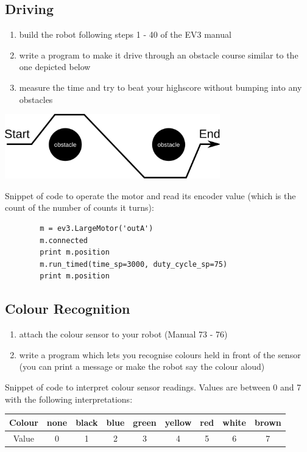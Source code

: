 \documentclass{article}
\begin{document}
  \subsection{Driving}
  \begin{enumerate}
    \item build the robot following steps 1 - 40 of the EV3 manual
    \item write a program to make it drive through an obstacle course similar 
        to the one depicted below
    \item measure the time and try to beat your highscore without bumping 
        into any obstacles
  \end{enumerate}

    \begin{center}
        \includegraphics[width=0.7\textwidth]{obstacle_course}
    \end{center}

    Snippet of code to operate the motor and read its encoder value
    (which is the count of the number of counts it turns): \\
    \begin{verbatim}
        m = ev3.LargeMotor('outA')
        m.connected
        print m.position
        m.run_timed(time_sp=3000, duty_cycle_sp=75)
        print m.position
    \end{verbatim}

  \subsection{Colour Recognition}
  \begin{enumerate}
      \item attach the colour sensor to your robot (Manual 73 - 76) 
    \item write a program which lets you recognise colours held in front of the sensor (you
        can print a message or make the robot say the colour aloud)
  \end{enumerate}

  Snippet of code to interpret colour sensor readings. Values are between
  0 and 7 with the following interpretations:
  \begin{table}[h]
      \centering
      \begin{tabular}{ c | c | c | c | c | c | c | c | c }
          Colour & none & black & blue & green & yellow & red & white & brown \\
          \hline
          Value & 0 & 1 & 2 & 3 & 4 & 5 & 6 & 7 \\
      \end{tabular}
  \end{table}
\end{document}
